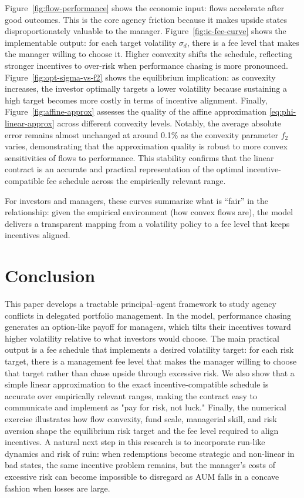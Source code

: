 \documentclass[11pt]{article}
\begin{document}
Figure~\ref{fig:flow-performance} shows the economic input: flows accelerate after good outcomes. This is the core agency friction because it makes upside states disproportionately valuable to the manager.
Figure~\ref{fig:ic-fee-curve} shows the implementable output: for each target volatility $\sigma_d$, there is a fee level that makes the manager willing to choose it. Higher convexity shifts the schedule, reflecting stronger incentives to over-risk when performance chasing is more pronounced.
Figure~\ref{fig:opt-sigma-vs-f2} shows the equilibrium implication: as convexity increases, the investor optimally targets a lower volatility because sustaining a high target becomes more costly in terms of incentive alignment.
Finally, Figure~\ref{fig:affine-approx} assesses the quality of the affine approximation \eqref{eq:phi-linear-approx} across different convexity levels. Notably, the average absolute error remains almost unchanged at around 0.1\% as the convexity parameter $f_2$ varies, demonstrating that the approximation quality is robust to more convex sensitivities of flows to performance. This stability confirms that the linear contract is an accurate and practical representation of the optimal incentive-compatible fee schedule across the empirically relevant range.

For investors and managers, these curves summarize what is “fair” in the relationship: given the empirical environment (how convex flows are), the model delivers a transparent mapping from a volatility policy to a fee level that keeps incentives aligned.



\section{Conclusion}
This paper develops a tractable principal--agent framework to study agency conflicts in delegated portfolio management. In the model, performance chasing generates an option-like payoff for managers, which tilts their incentives toward higher volatility relative to what investors would choose. The main practical output is a fee schedule that implements a desired volatility target: for each risk target, there is a management fee level that makes the manager willing to choose that target rather than chase upside through excessive risk. We also show that a simple linear approximation to the exact incentive-compatible schedule is accurate over empirically relevant ranges, making the contract easy to communicate and implement as "pay for risk, not luck." Finally, the numerical exercise illustrates how flow convexity, fund scale, managerial skill, and risk aversion shape the equilibrium risk target and the fee level required to align incentives.
A natural next step in this research is to incorporate run-like dynamics and risk of ruin: when redemptions become strategic and non-linear in bad states, the same incentive problem remains, but the manager's costs of excessive risk can become impossible to disregard as AUM falls in a concave fashion when losses are large.
\end{document}
